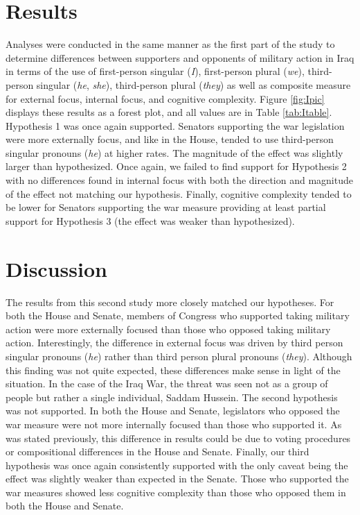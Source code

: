 \documentclass[jou,a4paper]{apa6}
\begin{document}
\section{Results}

Analyses were conducted in the same manner as the first part of the study to determine differences between supporters and opponents of military action in Iraq in terms of the use of first-person singular (\emph{I}), first-person plural (\emph{we}), third-person singular (\emph{he}, \emph{she}), third-person plural (\emph{they}) as well as composite measure for external focus, internal focus, and cognitive complexity. Figure \ref{fig:Ipic} displays these results as a forest plot, and all values are in Table \ref{tab:Itable}. Hypothesis 1 was once again supported. Senators supporting the war legislation were more externally focus, and like in the House, tended to use third-person singular pronouns (\emph{he}) at higher rates. The magnitude of the effect was slightly larger than hypothesized. Once again, we failed to find support for Hypothesis 2 with no differences found in internal focus with both the direction and magnitude of the effect not matching our hypothesis. Finally, cognitive complexity tended to be lower for Senators supporting the war measure providing at least partial support for Hypothesis 3 (the effect was weaker than hypothesized).

\section{Discussion}

The results from this second study more closely matched our hypotheses. For both the House and Senate, members of Congress who supported taking military action were more externally focused than those who opposed taking military action. Interestingly, the difference in external focus was driven by third person singular pronouns (\emph{he}) rather than third person plural pronouns (\emph{they}). Although this finding was not quite expected, these differences make sense in light of the situation. In the case of the Iraq War, the threat was seen not as a group of people but rather a single individual, Saddam Hussein. The second hypothesis was not supported. In both the House and Senate, legislators who opposed the war measure were not more internally focused than those who supported it. As was stated previously, this difference in results could be due to voting procedures or compositional differences in the House and Senate. Finally, our third hypothesis was once again consistently supported with the only caveat being the effect was slightly weaker than expected in the Senate. Those who supported the war measures showed less cognitive complexity than those who opposed them in both the House and Senate.
\end{document}

